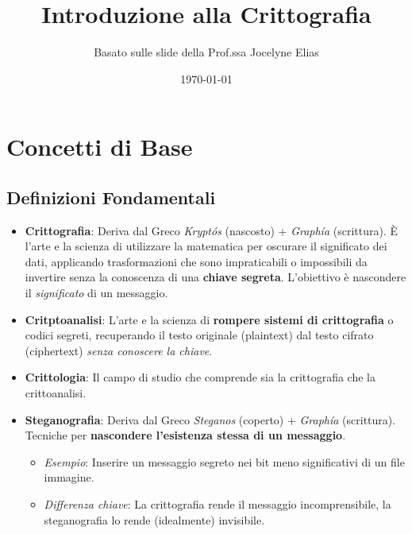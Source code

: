 

\title{Introduzione alla Crittografia}
\author{Basato sulle slide della Prof.ssa Jocelyne Elias}
\date{\today}



\maketitle
\tableofcontents
\newpage

\section{Concetti di Base}

\subsection{Definizioni Fondamentali}
\begin{itemize}
    \item \textbf{Crittografia}: Deriva dal Greco \textit{Kryptós} (nascosto) + \textit{Graphía} (scrittura). È l'arte e la scienza di utilizzare la matematica per oscurare il significato dei dati, applicando trasformazioni che sono impraticabili o impossibili da invertire senza la conoscenza di una \textbf{chiave segreta}. L'obiettivo è nascondere il \textit{significato} di un messaggio.

    \item \textbf{Critptoanalisi}: L'arte e la scienza di \textbf{rompere sistemi di crittografia} o codici segreti, recuperando il testo originale (plaintext) dal testo cifrato (ciphertext) \textit{senza conoscere la chiave}.

    \item \textbf{Crittologia}: Il campo di studio che comprende sia la crittografia che la crittoanalisi.

    \item \textbf{Steganografia}: Deriva dal Greco \textit{Steganos} (coperto) + \textit{Graphía} (scrittura). Tecniche per \textbf{nascondere l'esistenza stessa di un messaggio}.
    \begin{itemize}
        \item \textit{Esempio}: Inserire un messaggio segreto nei bit meno significativi di un file immagine.
        \item \textit{Differenza chiave}: La crittografia rende il messaggio incomprensibile, la steganografia lo rende (idealmente) invisibile.
    \end{itemize}
\end{itemize}

